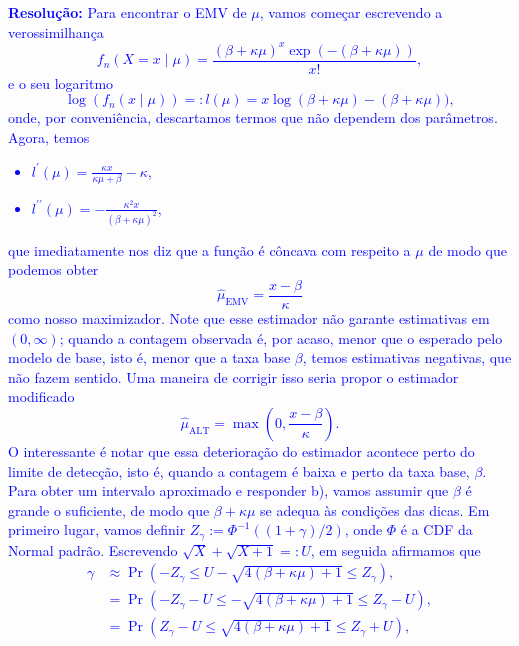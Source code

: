 \documentclass[a4paper,10pt, notitlepage]{report}
\newcommand{\pr}{\operatorname{Pr}} %
\begin{document}
\textcolor{blue}{
\textbf{Resolução:}
Para encontrar o EMV de $\mu$, vamos começar escrevendo a verossimilhança
\begin{equation*}
 f_n(X = x \mid \mu) = \frac{(\beta + \kappa\mu)^x \exp(-(\beta + \kappa\mu))}{x!},
\end{equation*}
e o seu logaritmo
\begin{equation*}
 \log (f_n(x \mid \mu)) =: l(\mu) = x\log(\beta + \kappa\mu)-(\beta + \kappa\mu)),
\end{equation*}
onde, por conveniência, descartamos termos que não dependem dos parâmetros.
Agora, temos
\begin{itemize}
 \item $l^\prime(\mu) = \frac{\kappa x}{\kappa\mu + \beta} - \kappa$,
 \item $l^{\prime\prime}(\mu) = - \frac{\kappa^2x}{(\beta + \kappa\mu)^2}$,
\end{itemize}
que imediatamente nos diz que a função é côncava com respeito a $\mu$ de modo que podemos obter
\begin{equation*}
 \hat{\mu}_{\text{EMV}} = \frac{x-\beta}{\kappa}
\end{equation*}
como nosso maximizador.
Note que esse estimador não garante estimativas em $(0, \infty)$; quando a contagem observada é, por acaso, menor que o esperado pelo modelo de base, isto é, menor que a taxa base $\beta$, temos estimativas negativas, que não fazem sentido.
Uma maneira de corrigir isso seria propor o estimador modificado
\begin{equation*}
 \hat{\mu}_{\text{ALT}} = \max\left(0, \frac{x-\beta}{\kappa}\right).
\end{equation*}
O interessante é notar que essa deterioração do estimador acontece perto do limite de detecção, isto é, quando a contagem é baixa e perto da taxa base, $\beta$.
Para obter um intervalo aproximado e responder b), vamos assumir que $\beta$ é grande o suficiente, de modo que $\beta + \kappa\mu$ se adequa às condições das dicas.
Em primeiro lugar, vamos definir $Z_{\gamma} := \Phi^{-1}((1+\gamma)/ 2)$, onde $\Phi$ é a CDF da Normal padrão.
Escrevendo $\sqrt{X} + \sqrt{X+1} =: U$, em seguida afirmamos que
\begin{align*}
 \gamma &\approx \pr\left(-Z_{\gamma} \leq U - \sqrt{4(\beta + \kappa\mu) + 1}\leq Z_{\gamma}\right),\\
 &= \pr\left(-Z_{\gamma} - U \leq  - \sqrt{4(\beta + \kappa\mu) + 1}\leq Z_{\gamma} - U \right),\\
 &=  \pr\left(Z_{\gamma} - U \leq \sqrt{4(\beta + \kappa\mu) + 1}\leq Z_{\gamma} + U \right),\\

\end{align*}}
\end{document}

